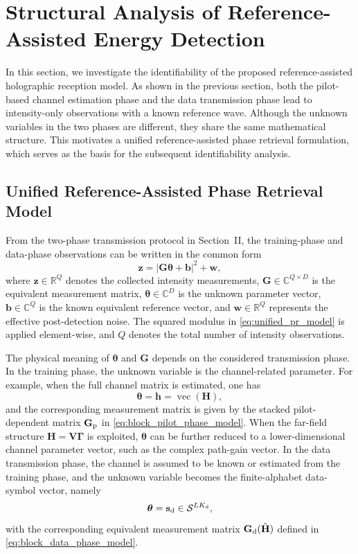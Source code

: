 \documentclass[journal]{IEEEtran}
\begin{document}
\section{Structural Analysis of Reference-Assisted Energy Detection}

In this section, we investigate the identifiability of the proposed reference-assisted holographic reception model. 
As shown in the previous section, both the pilot-based channel estimation phase and the data transmission phase lead to intensity-only observations with a known reference wave. 
Although the unknown variables in the two phases are different, they share the same mathematical structure. 
This motivates a unified reference-assisted phase retrieval formulation, which serves as the basis for the subsequent identifiability analysis.

\subsection{Unified Reference-Assisted Phase Retrieval Model}

From the two-phase transmission protocol in Section~II, the training-phase and data-phase observations can be written in the common form
\begin{equation}
\mathbf{z}
=
\left|
\mathbf{G}\boldsymbol{\theta}
+
\mathbf{b}
\right|^2
+
\mathbf{w},
\label{eq:unified_pr_model}
\end{equation}
where $\mathbf{z}\in\mathbb{R}^{Q}$ denotes the collected intensity measurements, $\mathbf{G}\in\mathbb{C}^{Q\times D}$ is the equivalent measurement matrix, $\boldsymbol{\theta}\in\mathbb{C}^{D}$ is the unknown parameter vector, $\mathbf{b}\in\mathbb{C}^{Q}$ is the known equivalent reference vector, and $\mathbf{w}\in\mathbb{R}^{Q}$ represents the effective post-detection noise. 
The squared modulus in \eqref{eq:unified_pr_model} is applied element-wise, and $Q$ denotes the total number of intensity observations.

The physical meaning of $\boldsymbol{\theta}$ and $\mathbf{G}$ depends on the considered transmission phase. 
In the training phase, the unknown variable is the channel-related parameter. 
For example, when the full channel matrix is estimated, one has
\begin{equation}
\boldsymbol{\theta}=\mathbf{h}=\operatorname{vec}(\mathbf{H}),
\end{equation}
and the corresponding measurement matrix is given by the stacked pilot-dependent matrix $\mathbf{G}_{\rm p}$ in \eqref{eq:block_pilot_phase_model}. 
When the far-field structure $\mathbf{H}=\mathbf{V}\boldsymbol{\Gamma}$ is exploited, $\boldsymbol{\theta}$ can be further reduced to a lower-dimensional channel parameter vector, such as the complex path-gain vector. 
In the data transmission phase, the channel is assumed to be known or estimated from the training phase, and the unknown variable becomes the finite-alphabet data-symbol vector, namely
\begin{equation}
\boldsymbol{\theta}=\mathbf{s}_{\rm d}\in\mathcal{S}^{LK_{\rm d}},
\end{equation}
with the corresponding equivalent measurement matrix $\mathbf{G}_{\rm d}(\hat{\mathbf{H}})$ defined in \eqref{eq:block_data_phase_model}.
\end{document}
